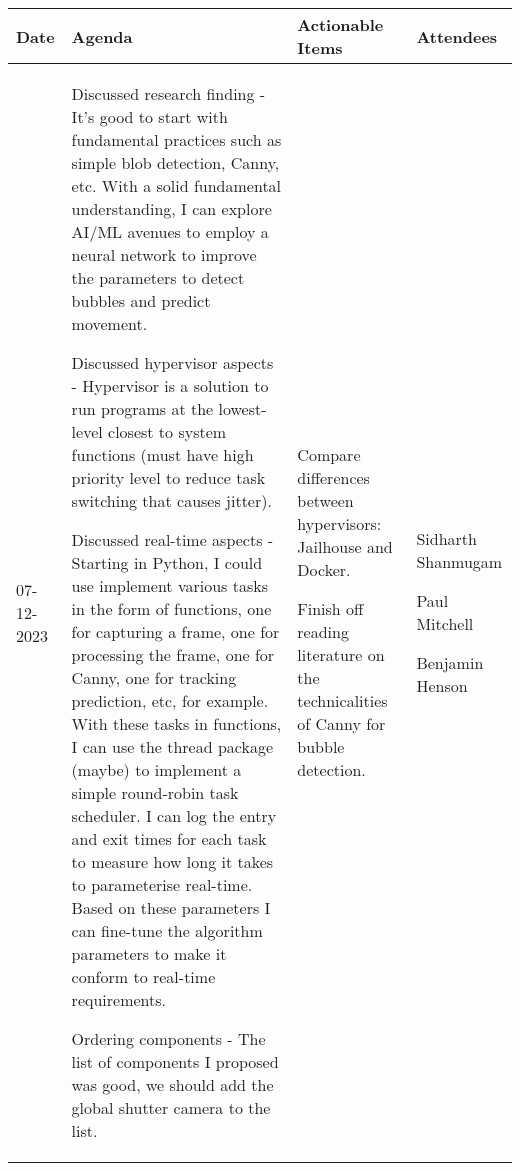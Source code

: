 \begin{table}[!h]
    \centering
    \begin{tabularx}{\textwidth}{|l|X|X|X|}
        \hline
        Date & Agenda & Actionable Items & Attendees \\
        \hline
        \hline
        07-12-2023 & 
        \begin{myitemize}
            \item Discussed research finding - It's good to start with fundamental practices such as simple blob detection, Canny, etc. With a solid fundamental understanding, I can explore AI/ML avenues to employ a neural network to improve the parameters to detect bubbles and predict movement.
            \item Discussed hypervisor aspects - Hypervisor is a solution to run programs at the lowest-level closest to system functions (must have high priority level to reduce task switching that causes jitter).
            \item Discussed real-time aspects - Starting in Python, I could use implement various tasks in the form of functions, one for capturing a frame, one for processing the frame, one for Canny, one for tracking prediction, etc, for example. With these tasks in functions, I can use the thread package (maybe) to implement a simple round-robin task scheduler. I can log the entry and exit times for each task to measure how long it takes to parameterise real-time. Based on these parameters I can fine-tune the algorithm parameters to make it conform to real-time requirements.
            \item Ordering components - The list of components I proposed was good, we should add the global shutter camera to the list.
        \end{myitemize} &
        \begin{myitemize}
            \item Compare differences between hypervisors: Jailhouse and Docker.
            \item Finish off reading literature on the technicalities of Canny for bubble detection.
        \end{myitemize} &
        \begin{myitemize}
            \item Sidharth Shanmugam
            \item Paul Mitchell
            \item Benjamin Henson
        \end{myitemize} \\
        \hline
    \end{tabularx}
\end{table}
